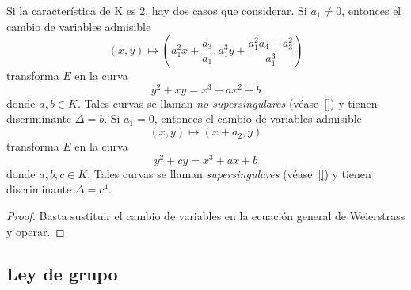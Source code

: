 \begin{lema}
	Si la característica de K es 2, hay dos casos que considerar. Si $a_1 \neq 0$, entonces el cambio de variables admisible
	$$
	(x, y) \mapsto \left(a_1^2 x + \frac{a_3}{a_1}, a_1^3 y + \frac{a_1^2 a_4 + a_3^2}{a_1^3} \right)
	$$
	transforma $E$ en la curva
	\begin{equation*}
		y^2 + xy = x^3 + a x^2 + b
	\end{equation*}
	donde $a, b \in K$. Tales curvas se llaman \emph{no supersingulares} (véase~\ref{}) y tienen discriminante $\Delta = b$. Si $a_1 = 0$, entonces el cambio de variables admisible
	$$
	(x, y) \mapsto (x + a_2, y)
	$$
	transforma $E$ en la curva
	\begin{equation*}
		y^2 + c y = x^3 + a x + b
	\end{equation*}
	donde $a, b, c \in K$. Tales curvas se llaman \emph{supersingulares} (véase~\ref{}) y tienen discriminante $\Delta = c^4$.
\end{lema}
\begin{proof}
	Basta sustituir el cambio de variables en la ecuación general de Weierstrass y operar.
\end{proof}




\subsection{Ley de grupo}
\label{sub:Ley de grupo}

